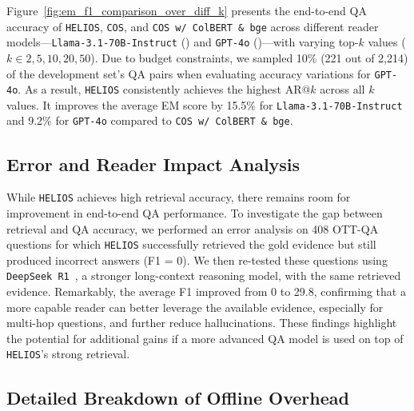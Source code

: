 Figure~\ref{fig:em_f1_comparison_over_diff_k} presents the end-to-end QA accuracy of \texttt{HELIOS}, \texttt{COS}, and \texttt{COS w/ ColBERT \& bge} across different reader models—\texttt{Llama-3.1-70B-Instruct} (\citealp{dubey2024llama}) and \texttt{GPT-4o} (\citealp{hurst2024gpt})—with varying top-$k$ values ($k \in {2, 5, 10, 20, 50}$). 
Due to budget constraints, we sampled 10\% (221 out of 2,214) of the development set's QA pairs when evaluating accuracy variations for \texttt{GPT-4o}. 
As a result, \texttt{HELIOS} consistently achieves the highest AR@$k$ across all $k$ values. 
It improves the average EM score by 15.5\% for \texttt{Llama-3.1-70B-Instruct} and 9.2\% for \texttt{GPT-4o} compared to \texttt{COS w/ ColBERT \& bge}.

\subsection{Error and Reader Impact Analysis}
\label{sec:reader_impact}
{
\feditcolor
While \texttt{HELIOS} achieves high retrieval accuracy, there remains room for improvement in end-to-end QA performance. 
To investigate the gap between retrieval and QA accuracy, we performed an error analysis on 408 OTT-QA questions for which \texttt{HELIOS} successfully retrieved the gold evidence but still produced incorrect answers (F1 = 0).
We then re-tested these questions using \texttt{DeepSeek R1}~\citep{liu2024deepseek}, a stronger long-context reasoning model, with the same retrieved evidence.
Remarkably, the average F1 improved from 0 to 29.8, confirming that a more capable reader can better leverage the available evidence, especially for multi-hop questions, and further reduce hallucinations.
These findings highlight the potential for additional gains if a more advanced QA model is used on top of \texttt{HELIOS}’s strong retrieval.
}


\subsection{Detailed Breakdown of Offline Overhead}
\label{sec:appendix_offline_overhead}

